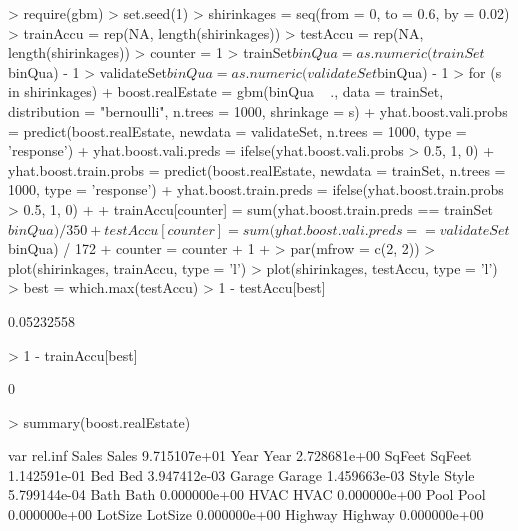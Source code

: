\documentclass[a4paper]{article}
\begin{document}
\begin{Schunk}
\begin{Sinput}
> require(gbm)
> set.seed(1)
> shirinkages = seq(from = 0, to = 0.6, by = 0.02)
> trainAccu = rep(NA, length(shirinkages))
> testAccu = rep(NA, length(shirinkages))
> counter = 1
> trainSet$binQua = as.numeric(trainSet$binQua) - 1
> validateSet$binQua = as.numeric(validateSet$binQua) - 1
> for (s in shirinkages) {
+     boost.realEstate = gbm(binQua ~ ., data = trainSet, distribution = "bernoulli", n.trees = 1000, shrinkage = s)
+     yhat.boost.vali.probs = predict(boost.realEstate, newdata = validateSet, n.trees = 1000, type = 'response')
+     yhat.boost.vali.preds = ifelse(yhat.boost.vali.probs > 0.5, 1, 0)
+     yhat.boost.train.probs = predict(boost.realEstate, newdata = trainSet, n.trees = 1000, type = 'response')
+     yhat.boost.train.preds = ifelse(yhat.boost.train.probs > 0.5, 1, 0)
+ 
+     trainAccu[counter] = sum(yhat.boost.train.preds == trainSet$binQua) / 350
+     testAccu[counter] = sum(yhat.boost.vali.preds == validateSet$binQua) / 172
+     counter = counter + 1
+ }
> par(mfrow = c(2, 2))
> plot(shirinkages, trainAccu, type = 'l')
> plot(shirinkages, testAccu, type = 'l')
> best = which.max(testAccu)
> 1 - testAccu[best]
\end{Sinput}
\begin{Soutput}
[1] 0.05232558
\end{Soutput}
\begin{Sinput}
> 1 - trainAccu[best]
\end{Sinput}
\begin{Soutput}
[1] 0
\end{Soutput}
\begin{Sinput}
> summary(boost.realEstate)
\end{Sinput}
\begin{Soutput}
            var      rel.inf
Sales     Sales 9.715107e+01
Year       Year 2.728681e+00
SqFeet   SqFeet 1.142591e-01
Bed         Bed 3.947412e-03
Garage   Garage 1.459663e-03
Style     Style 5.799144e-04
Bath       Bath 0.000000e+00
HVAC       HVAC 0.000000e+00
Pool       Pool 0.000000e+00
LotSize LotSize 0.000000e+00
Highway Highway 0.000000e+00
\end{Soutput}
\end{Schunk}
\end{document}
